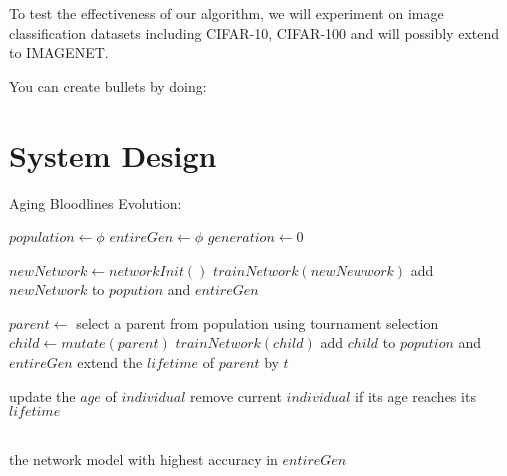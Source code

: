 \documentclass{article}
\begin{document}
\begin{normalsize}
    To test the effectiveness of our algorithm, we will experiment on image classification datasets including CIFAR-10, CIFAR-100 and will possibly extend to IMAGENET.
      
    \noindent You can create bullets by doing:

  \section{System Design}

  \begin{algorithm}[htb]  
    \caption{ Aging Bloodlines Evolution:}
    \begin{algorithmic}[1]  
  
    \State $population\gets \phi$
    \State $entireGen\gets \phi$
    \State $generation\gets 0$
    
    \State $newNetwork\gets networkInit()$
    \State $trainNetwork(newNewwork)$
    \State add $newNetwork$ to $popution$ and $entireGen$
    \EndWhile
    
  
    
      \State $parent\gets$ select a parent from population using tournament selection 
      \State $child \gets mutate(parent)$
      \State $trainNetwork(child)$
      \State add $child$ to $popution$ and $entireGen$
        \State extend the $lifetime$ of $parent$ by $t$
      \EndIf
      
        \State update the $age$ of $individual$
        \State remove current $individual$ if its age reaches its $lifetime$
      \EndFor
      
      
    \EndWhile
    
    
    \\  
    \Return the network model with highest accuracy in $entireGen$
 
  \end{algorithmic}  
  \end{algorithm}  


\end{normalsize}
     



\end{document}
